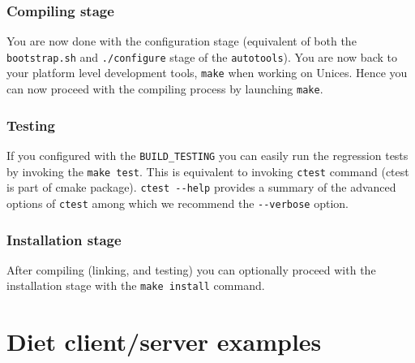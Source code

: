 \subsubsection{Compiling stage}
You are now done with the configuration stage (equivalent of both the
\verb+bootstrap.sh+ and \verb+./configure+ stage of the
\verb+autotools+). You are now back to your platform level
development tools, \ie \verb+make+ when working on Unices. Hence you
can now proceed with the compiling process by launching \verb+make+.

\subsubsection{Testing}
If you configured \diet with the \verb+BUILD_TESTING+ you can easily run the
regression tests by invoking the \verb+make test+. This is equivalent to
invoking \verb+ctest+ command (ctest is part of cmake
package). \verb+ctest --help+ provides a summary of the advanced options of
\verb+ctest+ among which we recommend the \verb+--verbose+ option.

\subsubsection{Installation stage}
After compiling (linking, and testing) you can optionally proceed with the
installation stage with the \verb+make install+ command.

\section{Diet client/server examples}
\label{section:diet-examples}

